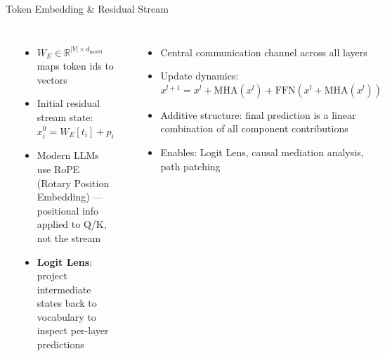\begin{frame}{Token Embedding \& Residual Stream}
  \begin{columns}[T]
    {\small\bfseries{}}
    \begin{itemize}\footnotesize\setlength\itemsep{3pt}
      \item $W_E \in \mathbb{R}^{|V|\times d_{\text{model}}}$ maps token ids to vectors
      \item Initial residual stream state:
        $x^0_i = W_E[t_i] + p_i$
      \item Modern LLMs use RoPE (Rotary Position Embedding) ---
        positional info applied to Q/K, not the stream
      \item \textbf{Logit Lens}: project intermediate states back to
        vocabulary to inspect per-layer predictions
    \end{itemize}

    {\small\bfseries{}}
    \begin{itemize}\footnotesize\setlength\itemsep{3pt}
      \item Central communication channel across all layers
      \item Update dynamics:
        $x^{l+1} = x^l + \text{MHA}(x^l) + \text{FFN}(x^l + \text{MHA}(x^l))$
      \item Additive structure: final prediction is a linear combination
        of all component contributions
      \item Enables: Logit Lens, causal mediation analysis, path patching
    \end{itemize}
  \end{columns}
  \vspace{0.4em}
  \vspace{0.1em}
  \centerline{}
\end{frame}

